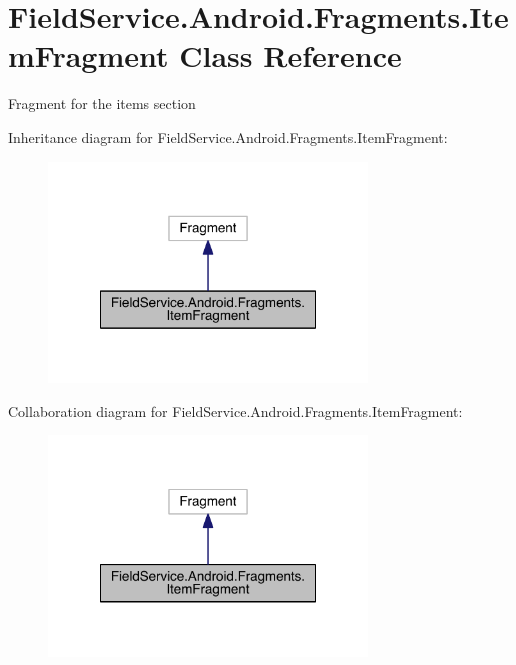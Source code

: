 \hypertarget{class_field_service_1_1_android_1_1_fragments_1_1_item_fragment}{\section{Field\+Service.\+Android.\+Fragments.\+Item\+Fragment Class Reference}
\label{class_field_service_1_1_android_1_1_fragments_1_1_item_fragment}
}


Fragment for the items section  




Inheritance diagram for Field\+Service.\+Android.\+Fragments.\+Item\+Fragment\+:
\nopagebreak
\begin{figure}[H]
\begin{center}
\leavevmode
\includegraphics[width=240pt]{class_field_service_1_1_android_1_1_fragments_1_1_item_fragment__inherit__graph}
\end{center}
\end{figure}


Collaboration diagram for Field\+Service.\+Android.\+Fragments.\+Item\+Fragment\+:
\nopagebreak
\begin{figure}[H]
\begin{center}
\leavevmode
\includegraphics[width=240pt]{class_field_service_1_1_android_1_1_fragments_1_1_item_fragment__coll__graph}
\end{center}
\end{figure}
